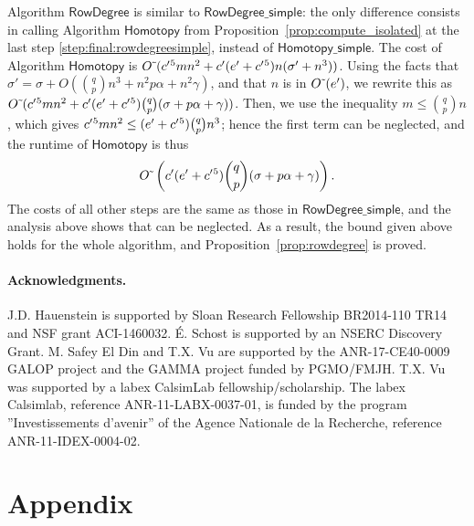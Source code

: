 \documentclass[12pt]{article}
\begin{document}
Algorithm $\mathsf{RowDegree}$ is similar to
$\mathsf{RowDegree\_simple}$: the only difference consists in calling
Algorithm $\mathsf{Homotopy}$ from
Proposition~\ref{prop:compute_isolated} at the last step
\eqref{step:final:rowdegreesimple}, instead of
$\mathsf{Homotopy\_simple}$. The cost of Algorithm
$\mathsf{Homotopy}$ is ${O}{\,\tilde{ }\,}({c'}{}^5 m n^2 + {c'}{}({e'}{}+{c'}{}^5) n(\sigma'
+ n^3))$.  Using the facts that $\sigma'= \sigma +O( {q \choose p} n^3
+ n^2 p \alpha+ n^2\gamma)$, and that $n$ is in ${O}{\,\tilde{ }\,}({e'}{})$, we
rewrite this as ${O}{\,\tilde{ }\,}({c'}{}^5 m n^2 + {c'}{}({e'}{}+{c'}{}^5 ) {q \choose
  p}(\sigma + p \alpha+ \gamma))$.  Then, we use the inequality $m \le
{q \choose p} n$, which gives ${c'}{}^5 m n^2 \le ({e'}{}+{c'}{}^5) {q \choose
  p} n^3$; hence the first term can be neglected, and the runtime of
$\mathsf{Homotopy}$ is thus
\[
{O}{\,\tilde{ }\,}\left( {c'}{}({e'}{}+{c'}{}^5 ) {q \choose p}(\sigma  +  p \alpha+ \gamma)\right).
\]
The costs of all other steps are the same as those in
$\mathsf{RowDegree\_simple}$, and the analysis above shows that can be
neglected. As a result, the bound given above holds for the whole
algorithm, and Proposition~\ref{prop:rowdegree} is proved.

\paragraph*{Acknowledgments.} J.D. Hauenstein is supported by Sloan
Research Fellowship BR2014-110 TR14 and NSF grant
ACI-1460032. \'E. Schost is supported by an NSERC Discovery
Grant. M. Safey El Din and T.X. Vu are supported by the
ANR-17-CE40-0009 GALOP project and the GAMMA project funded by
PGMO/FMJH. T.X. Vu was supported by a labex CalsimLab
fellowship/scholarship. The labex Calsimlab, reference
ANR-11-LABX-0037-01, is funded by the program ''Investissements
d'avenir'' of the Agence Nationale de la Recherche, reference
ANR-11-IDEX-0004-02.

\vspace{-0.5cm}



\section*{Appendix}\label{appendix}
\end{document}
